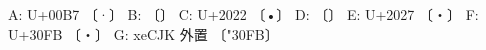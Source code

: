 \documentclass[12pt,UTF8]{ctexbook}
\begin{document}
A: U+00B7 〔·〕  B: \textperiodcentered{} 〔\textperiodcentered{}〕
C: U+2022 〔•〕   D: \textbullet{} 〔\textbullet{}〕
E: U+2027 〔‧〕   F: \fbj U+30FB 〔{\fbj・}〕
G: xeCJK 外置 〔{\fbj\char"30FB}〕
\end{document}
